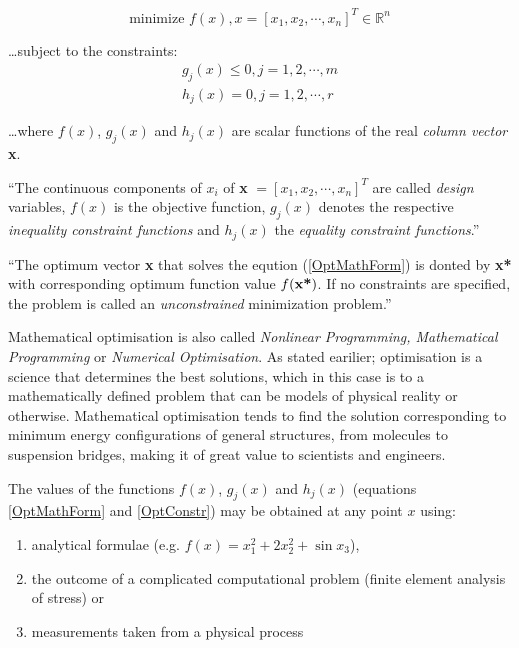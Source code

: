 \begin{equation}
\text{minimize }f(x),x=[x_1,x_2,\cdots,x_n]^T \in \mathbb{R}^n
\label{OptMathForm}
\end{equation}

\ldots subject to the constraints:
\begin{equation}
\begin{split}
g_j(x)\leq 0, j=1,2,\cdots,m \\
h_j(x)=0, j=1,2,\cdots,r
\label{OptConstr}
\end{split}
\end{equation}

\ldots where $f(x)$, $g_j(x)$ and $h_j(x)$ are scalar functions of the real \emph{column vector} \textbf{x}. \cite{snyman05}

``The continuous components of $x_i$ of \textbf{x} $=[x_1,x_2,\cdots,x_n]^T$ are called \emph{design} variables, $f(x)$ is the objective function, $g_j(x)$ denotes the respective \emph{inequality constraint functions} and $h_j(x)$ the \emph{equality constraint functions}.'' \cite{snyman05}

``The optimum vector \textbf{x} that solves the eqution (\ref{OptMathForm}) is donted by \textbf{x*} with corresponding optimum function value $f(\text{\textbf{x*}})$. If no constraints are specified, the problem is called an \emph{unconstrained} minimization problem.'' \cite{snyman05}

Mathematical optimisation is also called \emph{Nonlinear Programming, Mathematical Programming} or \emph{Numerical Optimisation}. As stated earilier; optimisation is a science that determines the best solutions, which in this case is to a mathematically defined problem that can be models of physical reality or otherwise. Mathematical optimisation tends to find the solution corresponding to minimum energy configurations of general structures, from molecules to suspension bridges, making it of great value to scientists and engineers.

The values of the functions $f(x)$, $g_j(x)$ and $h_j(x)$ (equations \ref{OptMathForm} and \ref{OptConstr}) may be obtained at any point $x$ using:\label{page:functionvalues}
\vspace{-0.5cm}
\begin{enumerate}
\item analytical formulae (e.g. $f(x)=x_1 ^2+2x_2 ^2+\sin x_3$),
\item the outcome of a complicated computational problem (finite element analysis of stress) or
\item measurements taken from a physical process
\end{enumerate}
\vspace{-0.5cm}

